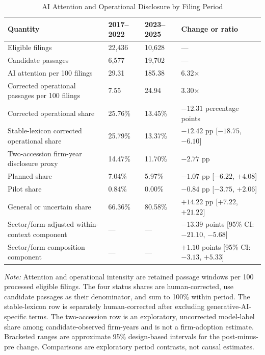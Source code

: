 \documentclass[12pt]{article}
\begin{document}
\begin{table}[htbp]
\centering
\caption{AI Attention and Operational Disclosure by Filing Period}
\label{tab:temporal_benchmark}
\small
\begin{tabularx}{\textwidth}{@{}p{}p{}
  p{}X@{}}
\toprule
Quantity & 2017--2022 & 2023--2025 & Change or ratio \\
\midrule
Eligible filings & 22,436 & 10,628 & --- \\
Candidate passages & 6,577 & 19,702 & --- \\
AI attention per 100 filings & 29.31 & 185.38 & 6.32$\times$ \\
Corrected operational passages per 100 filings & 7.55 & 24.94 & 3.30$\times$ \\
Corrected operational share & 25.76\% & 13.45\% &
$-12.31$ percentage points \\
Stable-lexicon corrected operational share & 25.79\% & 13.37\% &
$-12.42$ pp [$-18.75$, $-6.10$] \\
Two-accession firm-year disclosure proxy & 14.47\% & 11.70\% &
$-2.77$ pp \\
Planned share & 7.04\% & 5.97\% &
$-1.07$ pp [$-6.22$, $+4.08$] \\
Pilot share & 0.84\% & 0.00\% &
$-0.84$ pp [$-3.75$, $+2.06$] \\
General or uncertain share & 66.36\% & 80.58\% &
$+14.22$ pp [$+7.22$, $+21.22$] \\
Sector/form-adjusted within-context component & --- & --- &
$-13.39$ points [95\% CI: $-21.10$, $-5.68$] \\
Sector/form composition component & --- & --- &
$+1.10$ points [95\% CI: $-3.13$, $+5.33$] \\
\bottomrule
\end{tabularx}
\par\smallskip\footnotesize
\textit{Note:} Attention and operational intensity are retained passage windows
per 100 processed eligible filings. The four status shares are human-corrected,
use candidate passages as their denominator, and sum to 100\% within period.
The stable-lexicon row is separately human-corrected after excluding
generative-AI-specific terms. The two-accession row is an exploratory,
uncorrected model-label share among candidate-observed firm-years and is not a
firm-adoption estimate.
Bracketed ranges are approximate 95\% design-based intervals for the
post-minus-pre change. Comparisons are exploratory period contrasts, not causal
estimates.
\end{table}
\end{document}
